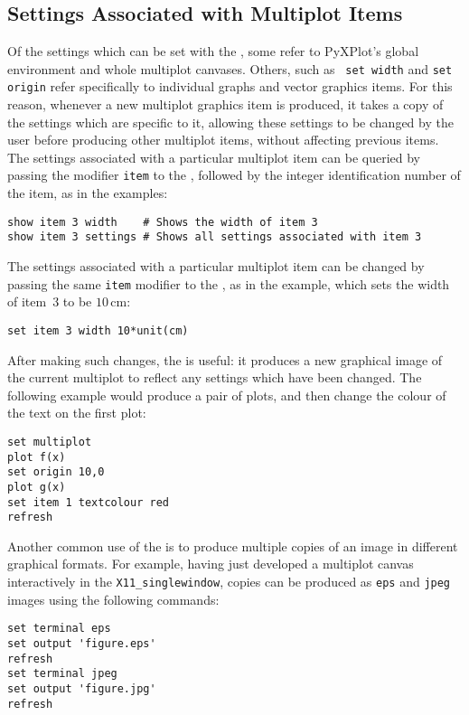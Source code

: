\subsection{Settings Associated with Multiplot Items}

Of the settings which can be set with the , some refer to
PyXPlot's global environment and whole multiplot canvases. Others, such as {\tt
set width} and {\tt set origin} refer specifically to individual graphs and
vector graphics items. For this reason, whenever a new multiplot graphics item
is produced, it takes a copy of the settings which are specific to it, allowing
these settings to be changed by the user before producing other multiplot
items, without affecting previous items. The settings associated with a
particular multiplot item can be queried by passing the modifier {\tt item} to
the , followed by the integer identification number of the item,
as in the examples:
\begin{verbatim}
show item 3 width    # Shows the width of item 3
show item 3 settings # Shows all settings associated with item 3
\end{verbatim}

The settings associated with a particular multiplot item can be changed by
passing the same {\tt item} modifier to the , as in the example,
which sets the width of item~3 to be $10\,\mathrm{cm}$:
\begin{verbatim}
set item 3 width 10*unit(cm)
\end{verbatim}
After making such changes, the  is useful: it produces a new
graphical image of the current multiplot to reflect any settings which have
been changed. The following example would produce a pair of plots, and then
change the colour of the text on the first plot:
\begin{verbatim}
set multiplot
plot f(x)
set origin 10,0
plot g(x)
set item 1 textcolour red
refresh
\end{verbatim}

Another common use of the  is to produce multiple
copies of an image in different graphical formats. For example, having just
developed a multiplot canvas interactively in the {\tt X11\_singlewindow},
copies can be produced as {\tt eps} and {\tt jpeg} images using the following
commands:
\begin{verbatim}
set terminal eps
set output 'figure.eps'
refresh
set terminal jpeg
set output 'figure.jpg'
refresh
\end{verbatim}


